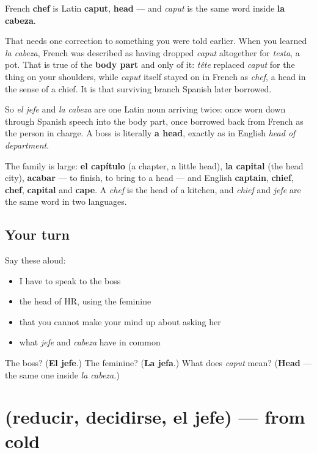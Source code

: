 \begin{cousinweb}
French \textbf{chef} is Latin \textbf{caput}, \textbf{head} — and \emph{caput} is the same word inside \textbf{la cabeza}.

That needs one correction to something you were told earlier. When you learned \emph{la cabeza}, French was described as having dropped \emph{caput} altogether for \emph{testa}, a pot. That is true of the \textbf{body part} and only of it: \emph{tête} replaced \emph{caput} for the thing on your shoulders, while \emph{caput} itself stayed on in French as \emph{chef}, a head in the sense of a chief. It is that surviving branch Spanish later borrowed.

So \emph{el jefe} and \emph{la cabeza} are one Latin noun arriving twice: once worn down through Spanish speech into the body part, once borrowed back from French as the person in charge. A boss is literally \textbf{a head}, exactly as in English \emph{head of department}.

The family is large: \textbf{el capítulo} (a chapter, a little head), \textbf{la capital} (the head city), \textbf{acabar} — to finish, to bring to a head — and English \textbf{captain}, \textbf{chief}, \textbf{chef}, \textbf{capital} and \textbf{cape}. A \emph{chef} is the head of a kitchen, and \emph{chief} and \emph{jefe} are the same word in two languages.
\end{cousinweb}

\subsection*{Your turn}
Say these aloud:

\begin{itemize}
\raggedright
  \item I have to speak to the boss
  \item the head of HR, using the feminine
  \item that you cannot make your mind up about asking her
  \item what \emph{jefe} and \emph{cabeza} have in common
\end{itemize}

\begin{tcolorbox}[breakable,colback=teal!4,colframe=teal!35!black,title={Before you move on}]
The boss? (\textbf{El jefe}.) The feminine? (\textbf{La jefa}.) What does \emph{caput} mean? (\textbf{Head} — the same one inside \emph{la cabeza}.)
\end{tcolorbox}
\section[(reducir, decidirse, el jefe)]{(reducir, decidirse, el jefe) — from cold}

